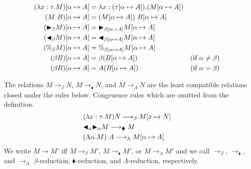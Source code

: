 
\begin{align*}
    (\lambda x:\tau.M)[\alpha \mapsto A] & = \lambda x:(\tau[\alpha \mapsto A]).(M[\alpha \mapsto A])                                  \\
    (M\ B)[\alpha \mapsto A]             & = (M[\alpha \mapsto A])\ B[\alpha\mapsto A]                                                 \\
    ({\mathop{\blacktriangleright}}_\beta M)[\alpha \mapsto A]      & = {\mathop{\blacktriangleright}}_{\beta[\alpha \mapsto A]}M[\alpha \mapsto A]                                          \\
    ({\mathop{\blacktriangleleft}}_\beta M)[\alpha \mapsto A]     & = {\mathop{\blacktriangleleft}}_{\beta[\alpha \mapsto A]}M[\alpha \mapsto A]                                         \\
    (\%_\beta M)[\alpha \mapsto A]       & = \%_{\beta[\alpha \mapsto A]}M[\alpha \mapsto A]                                           \\
    (\beta B)[\alpha \mapsto A]          & = \beta (B[\alpha\mapsto A])                               & (\text{if } \alpha \neq \beta) \\
    (\beta B)[\alpha \mapsto A]          & = A (B[\alpha\mapsto A])                                   & (\text{if } \alpha = \beta)
\end{align*}

\begin{definition}[Reduction]
    The relations $M \longrightarrow_\beta N$, $M \longrightarrow_\blacklozenge N$, and $M \longrightarrow_\Lambda N$
    are the least compatible relations closed under the rules below.
    Congruence rules which are omitted from the definition.
    \begin{align*}
         & (\lambda x:\tau.M) N \longrightarrow_\beta M[x \mapsto N]         \\
         & {\mathop{\blacktriangleleft}}_\alpha {\mathop{\blacktriangleright}}_\alpha M \longrightarrow_\blacklozenge M          \\
         & (\Lambda \alpha.M)\ A \longrightarrow_\Lambda M[\alpha \mapsto A]
    \end{align*}
    We write $ M \longrightarrow M'$ iff $ M \longrightarrow_\beta M'$, $ M \longrightarrow_\blacklozenge M'$, or $ M \longrightarrow_\Lambda M'$ and
    we call $\longrightarrow_\beta$, $\longrightarrow_\blacklozenge$, and $\longrightarrow_\Lambda$ $\beta$-reduction, $\blacklozenge$-reduction, and $\Lambda$-reduction, respectively.
\end{definition}

